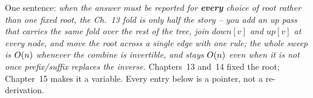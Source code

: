 

One sentence: \emph{when the answer must be reported for \textbf{every} choice of
root rather than one fixed root, the Ch.~13 fold is only half the story -- you
add an \emph{up pass} that carries the same fold over the rest of the tree, join
$\mathit{down}[v]$ and $\mathit{up}[v]$ at every node, and move the root across a
single edge with one  rule; the whole sweep is $O(n)$
whenever the combine is invertible, and stays $O(n)$ even when it is not once
prefix/suffix replaces the inverse.} Chapters~13 and~14 fixed the root; Chapter~15
makes it a variable. Every entry below is a pointer, not a re-derivation.


